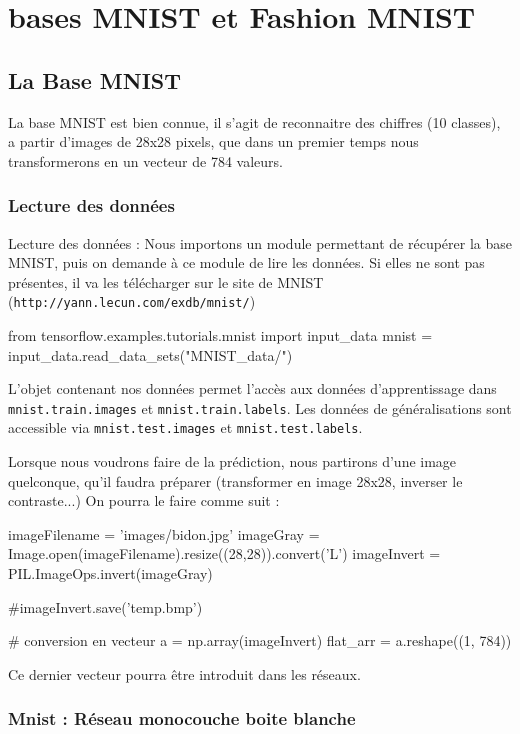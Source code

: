 \documentclass[a4paper,11pt]{book}
\begin{document}
\chapter{bases MNIST et Fashion MNIST}
\section{La Base MNIST}

La base MNIST est bien connue, il s'agit de reconnaitre des chiffres (10 classes), a partir d'images de 28x28 pixels, que dans un premier temps nous transformerons en un vecteur de 784 valeurs.

\subsection{Lecture des données}
\label{secGetMnist}
Lecture des données : Nous importons un module permettant de récupérer la base MNIST, puis on demande à ce module de lire les données. Si elles ne sont pas présentes, il va les télécharger sur le site de MNIST 
(\verb+http://yann.lecun.com/exdb/mnist/+)

\begin{mypython}
from tensorflow.examples.tutorials.mnist import input_data
mnist = input_data.read_data_sets("MNIST_data/")
\end{mypython}

L'objet contenant nos données permet l'accès aux données d'apprentissage dans \verb+mnist.train.images+ et \verb+mnist.train.labels+.
Les données de généralisations sont accessible via 
\verb+mnist.test.images+ et \verb+mnist.test.labels+.


Lorsque nous voudrons faire de la prédiction, nous partirons d'une image quelconque, qu'il faudra préparer (transformer en image 28x28, inverser le contraste...) On pourra le faire comme suit :
\begin{mypython}
imageFilename = 'images/bidon.jpg'
imageGray = Image.open(imageFilename).resize((28,28)).convert('L')
imageInvert =  PIL.ImageOps.invert(imageGray)

#imageInvert.save('temp.bmp')


# conversion en vecteur
a = np.array(imageInvert)
flat_arr = a.reshape((1, 784))
\end{mypython}
Ce dernier vecteur pourra être introduit dans les réseaux.


\subsection{Mnist : Réseau monocouche boite blanche}
\end{document}
